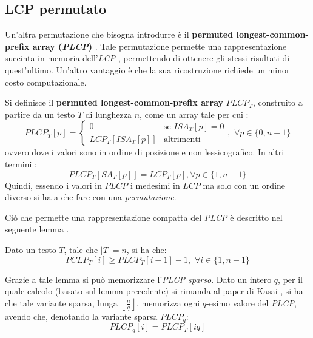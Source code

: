 \subsection{LCP permutato}
Un'altra permutazione che bisogna introdurre è il \textbf{permuted
  longest-common-prefix array (\textit{PLCP})} \cite{plcp}.
Tale permutazione
permette una rappresentazione succinta in memoria dell'\textit{LCP}
\cite{plcp2},
permettendo di ottenere gli stessi risultati di quest'ultimo. Un'altro vantaggio
è che la sua ricostruzione richiede un minor costo computazionale.
\begin{definizione}
  Si definisce il \textbf{permuted longest-common-prefix array} $PLCP_T$,
  construito a partire da un testo $T$ di lunghezza $n$, come un
  array tale per cui \cite{phoni}:
  \[PLCP_T[p]=
    \begin{cases}
      0&\mbox{se }ISA_T[p]=0\\
      LCP_T[ISA_T[p]]&\mbox{altrimenti}
    \end{cases},\,\,\forall p\in\{0,n-1\}
  \]
  ovvero dove i valori sono in ordine di posizione e non lessicografico. In
  altri termini \cite{plcp}:
  \[PLCP_T[SA_T[p]] = LCP_T[p],\forall p\in\{1,n-1\}\]
  Quindi, essendo i valori in $PLCP$ i medesimi in $LCP$ ma solo con un ordine
  diverso si ha a che fare con una \emph{permutazione}.
\end{definizione}
Ciò che permette una rappresentazione compatta del \textit{PLCP} è descritto nel
seguente lemma \cite{plcp3}.
\begin{lemma}
  Dato un testo $T$, tale che $|T|=n$, si ha che:
  \[PCLP_T[i]\geq PLCP_T[i-1]-1,\,\,\forall i\in\{1,n-1\}\]
\end{lemma}
Grazie a tale lemma si può memorizzare l'\textit{PLCP sparso}. Dato un intero
$q$, per il quale calcolo (basato sul lemma precedente) si rimanda al paper di
Kasai \cite{plcp3}, si ha che 
tale variante sparsa, lunga $\left\lfloor\frac{n}{q}\right\rfloor$, memorizza
ogni $q$-esimo valore del \textit{PLCP}, avendo che, denotando la variante
sparsa $PLCP_q$:
\[PLCP_q[i]=PLCP_T[iq]\]
